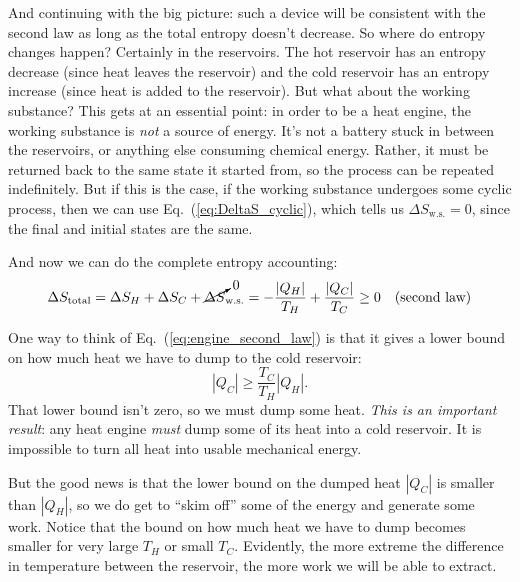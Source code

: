 And continuing with the big picture: such a device will be consistent
with the second law as long as the total entropy doesn't decrease.  So
where do entropy changes happen?  Certainly in the reservoirs.  The
hot reservoir has an entropy decrease (since heat leaves the
reservoir) and the cold reservoir has an entropy increase 
(since heat is added to the reservoir).  But what about the 
working substance?  This gets at an
essential point: in order to be a heat engine, the working substance is {\it
  not} a source of energy.  It's not a battery stuck in between the
reservoirs, or anything else consuming chemical energy.  Rather, it
must be returned back to the same state it started from, so the
process can be repeated indefinitely.  But if this is the case, if the
working substance undergoes some cyclic process, then we
can use Eq.~(\ref{eq:DeltaS_cyclic}), which tells us $\Delta
S_\text{w.s.}=0$, since the final and initial states are the same.

And now we can do the complete entropy accounting:
\begin{equation}
  \Delta S_\text{total}= \Delta S_H + \Delta S_C + 
  \cancelto{0}{\Delta S}_\text{w.s.}
  = -\frac{|Q_H|}{T_H}+ \frac{|Q_C|}{T_C}  \geq 0 \quad\text{(second
    law)}
\label{eq:engine_second_law}
\end{equation}

One way to think of Eq.~(\ref{eq:engine_second_law}) is that it gives
a lower bound on how much heat we have to dump to the cold reservoir:
\begin{equation}
|Q_C| \geq \frac{T_C}{T_H}|Q_H|.
\end{equation}
That lower bound isn't zero, so we must dump some heat.
{\it This is an important result\/}:  any heat engine {\it must\/}
dump some of its heat into a cold reservoir.  It is impossible
to turn all heat into usable mechanical energy. 

But the good news is that the lower bound on the dumped heat $|Q_C|$
is smaller than $|Q_H|$, so we do get to ``skim off'' some of the
energy and generate some work.  Notice that the bound on how much heat
we have to dump becomes smaller for very large $T_H$ or small $T_C$.
Evidently, the more extreme the difference in temperature between the
reservoir, the more work we will be able to extract.

